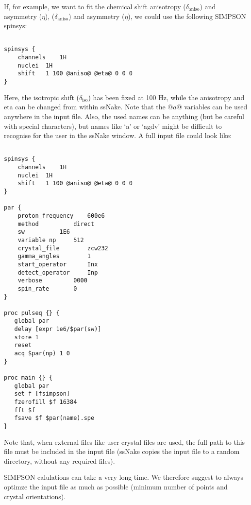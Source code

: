 \documentclass[11pt,a4paper]{article}
\begin{document}
If, for example, we want to fit the chemical shift anisotropy ($\delta_\text{aniso}$) and asymmetry ($\eta$), 
($\delta_\text{aniso}$) and asymmetry ($\eta$), we could use the following SIMPSON spinsys:

\lstset{language=tcl}          %

\begin{lstlisting}[frame=single]  % Start your code-block

spinsys {
    channels	1H
    nuclei	1H
    shift	1 100 @aniso@ @eta@ 0 0 0
}
\end{lstlisting}
Here, the isotropic shift ($\delta_\text{iso}$) has been fixed at 100 Hz, while the anisotropy and
eta can be changed from within ssNake. Note that the @$a$@ variables can be used anywhere in the
input file. Also, the used names can be anything (but be careful with special characters), but names
like `a' or `agdv' might be difficult to recognise for the user in the ssNake window.
A full input file could look like:

\begin{lstlisting}[frame=single]  % Start your code-block

spinsys {
    channels	1H
    nuclei	1H
    shift	1 100 @aniso@ @eta@ 0 0 0
}

par {
	proton_frequency	600e6
	method 			direct
	sw			1E6
	variable np		512
	crystal_file	  	zcw232
	gamma_angles		1
	start_operator		Inx
	detect_operator		Inp
	verbose			0000
	spin_rate 		0
}

proc pulseq {} {
   global par
   delay [expr 1e6/$par(sw)]
   store 1
   reset
   acq $par(np) 1 0
}

proc main {} {
   global par
   set f [fsimpson]
   fzerofill $f 16384
   fft $f
   fsave $f $par(name).spe
}
\end{lstlisting}
Note that, when external files like user crystal files are used, the full path to this file must be
included in the input file (ssNake copies the input file to a random directory, without any
required files).

SIMPSON calulations can take a very long time. We therefore suggest to always optimze the input file
as much as possible (minimum number of points and crystal orientations).
\end{document}
